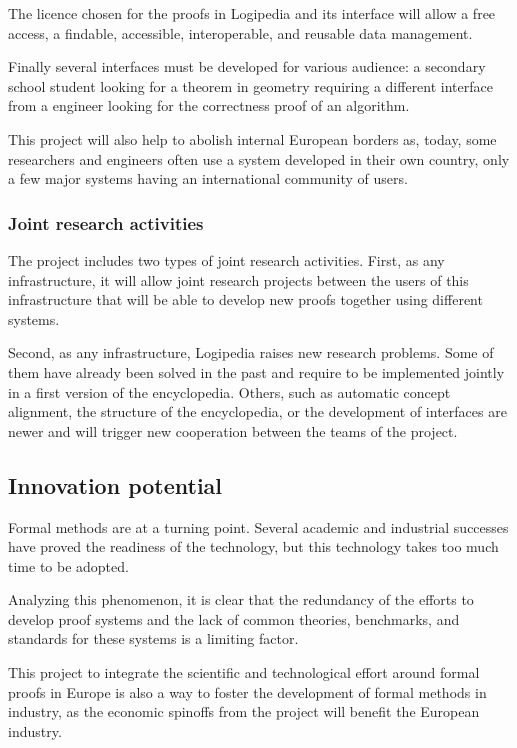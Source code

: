 The licence chosen for the proofs in {\sc Logipedia} and its interface
will allow a free access, a findable, accessible, interoperable, and
reusable data management.

Finally several interfaces must be developed for various audience: a
secondary school student looking for a theorem in geometry requiring a
different interface from a engineer looking for the correctness proof
of an algorithm.

This project will also help to abolish internal European borders as,
today, some researchers and engineers often use a system developed in
their own country, only a few major systems having an international
community of users.

\subsubsection{Joint research activities}

The project includes two types of joint research activities.  First,
as any infrastructure, it will allow joint research projects
between the users of this infrastructure that will be able to develop
new proofs together using different systems.

Second, as any infrastructure, {\sc Logipedia} raises new research
problems. Some of them have already been solved in the past and
require to be implemented jointly in a first version of the
encyclopedia. Others, such as automatic concept alignment, the
structure of the encyclopedia, or the development of interfaces are
newer and will trigger new cooperation between the teams of the
project.

\subsection{Innovation potential}

Formal methods are at a turning point. Several academic and
industrial successes have proved the readiness of the technology, but
this technology takes too much time to be adopted.

Analyzing this phenomenon, it is clear that the redundancy of the
efforts to develop proof systems and the lack of common theories,
benchmarks, and standards for these systems is a limiting factor.

This project to integrate the scientific and technological effort
around formal proofs in Europe is also a way to foster the
development of formal methods in industry, as the economic spinoffs
from the project will benefit the European industry.

